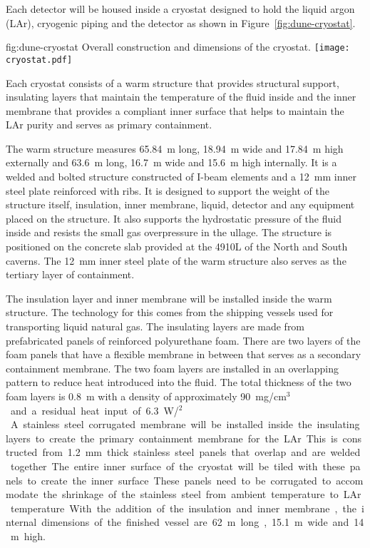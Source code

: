 Each detector will be housed inside a cryostat designed to hold the
liquid argon (LAr), cryogenic piping and the detector as shown in
Figure~\ref{fig:dune-cryostat}.
\begin{dunefigure}{fig:dune-cryostat}
  {Overall construction and dimensions of the  cryostat.}
  \texttt{[image: cryostat.pdf]}
\end{dunefigure}
Each cryostat consists of a warm structure that provides structural
support, insulating layers that maintain the temperature of the fluid
inside and the inner membrane that provides a compliant inner surface
that helps to maintain the LAr purity and serves as primary
containment.

The warm structure measures \SI{65.84}{\meter} long,
\SI{18.94}{\meter} wide and \SI{17.84}{\meter} high externally and
\SI{63.6}{\meter} long, \SI{16.7}{\meter} wide and \SI{15.6}{\meter}
high internally.  It is a welded and bolted structure constructed of
I-beam elements and a \SI{12}{\mm} inner steel plate reinforced with
ribs.  It is designed to support the
weight of the structure itself, 
insulation, inner membrane, liquid, detector and any equipment placed
on the structure.  It also supports the hydrostatic pressure of the
fluid inside and resists the small gas overpressure in the ullage.
The structure is positioned on the concrete slab provided at the 4910L
of the North and South caverns.  The \SI{12}{\mm} inner steel plate of the
warm structure also serves as the tertiary layer of containment.

The insulation layer and inner membrane will be installed inside the
warm structure.  The technology for this comes from the shipping
vessels used for transporting liquid natural gas. The insulating
layers are made from prefabricated panels of reinforced polyurethane
foam.  There are two layers of the foam panels that have a flexible
membrane in between that serves as a secondary containment membrane.
The two foam layers are installed in an overlapping pattern to reduce
heat introduced into the fluid.  The total thickness of the two foam
layers is \SI{0.8}{\meter} with a density of approximately
\SI{90}{mg/cm$^3$} and a residual heat input of
\SI{6.3}{W/\meter$^2$}.  A stainless steel corrugated membrane will be
installed inside the insulating layers to create the primary
containment membrane for the LAr.  This is constructed from \SI{1.2}{\mm}
thick stainless steel panels that overlap and are welded together.
The entire inner surface of the cryostat will be tiled with these
panels to create the inner surface.  These panels need to be
corrugated to accommodate the shrinkage of the stainless steel from
ambient temperature to LAr temperature.  With the addition of the
insulation and inner membrane, the internal dimensions of the finished
vessel are \SI{62}{\meter} long, \SI{15.1}{\meter} wide and
\SI{14}{\meter} high.

